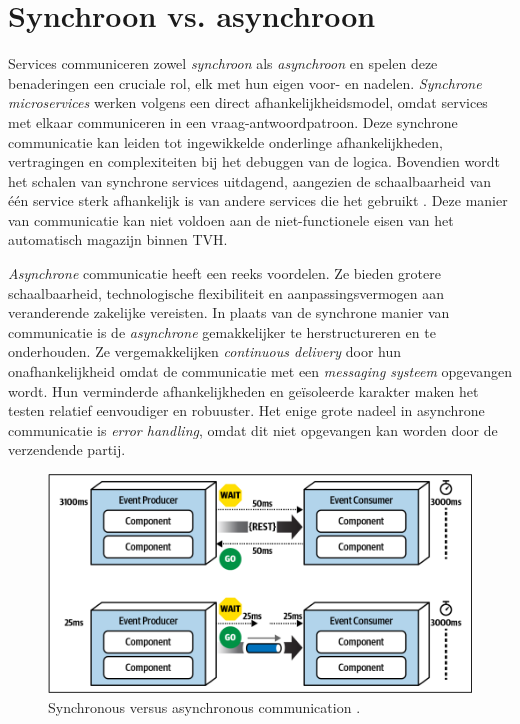 \section{Synchroon vs. asynchroon}
Services communiceren zowel \emph{synchroon} als \emph{asynchroon} en spelen deze benaderingen een cruciale rol, 
elk met hun eigen voor- en nadelen. \emph{Synchrone microservices} werken volgens een direct 
afhankelijkheidsmodel, omdat services met elkaar communiceren in een vraag-antwoordpatroon. 
Deze synchrone communicatie kan leiden tot ingewikkelde onderlinge afhankelijkheden, vertragingen en complexiteiten bij het debuggen 
van de logica. Bovendien wordt het schalen van synchrone services uitdagend, 
aangezien de schaalbaarheid van één service sterk afhankelijk is van andere services die het gebruikt \autocite{Bellemare2020}. 
Deze manier van communicatie kan niet voldoen aan de niet-functionele eisen van het automatisch magazijn binnen TVH.
\newline

\emph{Asynchrone} communicatie heeft een reeks voordelen. Ze bieden grotere schaalbaarheid, technologische 
flexibiliteit en aanpassingsvermogen aan veranderende zakelijke vereisten. 
In plaats van de synchrone manier van communicatie is de \emph{asynchrone} gemakkelijker te herstructureren en te onderhouden. 
Ze vergemakkelijken \emph{continuous delivery} door hun onafhankelijkheid omdat de communicatie 
met een \emph{messaging systeem} opgevangen wordt. 
Hun verminderde afhankelijkheden en geïsoleerde karakter maken het testen relatief eenvoudiger en robuuster.
Het enige grote nadeel in asynchrone communicatie is \emph{error handling}, 
omdat dit niet opgevangen kan worden door de verzendende partij.
\newline

\begin{figure}[h!]
  \centering
  \includegraphics[width=.5\textwidth]{../voorstel/img/synchronous_vs_async_calls.png}
  \caption{\label{fig:sync-vs-async}Synchronous versus asynchronous communication \autocite[figure 14 -- 13]{MarkRichards2021}.}
\end{figure}

